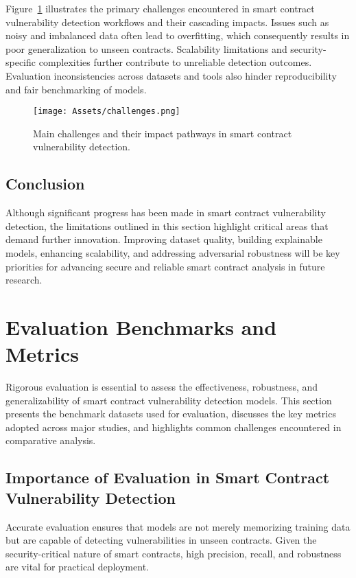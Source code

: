 Figure~\ref{fig:challenges_vulnerability_detection} illustrates the primary challenges encountered in smart contract vulnerability detection workflows and their cascading impacts. Issues such as noisy and imbalanced data often lead to overfitting, which consequently results in poor generalization to unseen contracts. Scalability limitations and security-specific complexities further contribute to unreliable detection outcomes. Evaluation inconsistencies across datasets and tools also hinder reproducibility and fair benchmarking of models.

\begin{figure}[H]
    \centering
    \texttt{[image: Assets/challenges.png]}
    \caption{Main challenges and their impact pathways in smart contract vulnerability detection.}
    \label{fig:challenges_vulnerability_detection}
\end{figure}
\subsection*{Conclusion}

Although significant progress has been made in smart contract vulnerability detection, the limitations outlined in this section highlight critical areas that demand further innovation. Improving dataset quality, building explainable models, enhancing scalability, and addressing adversarial robustness will be key priorities for advancing secure and reliable smart contract analysis in future research.

\section{Evaluation Benchmarks and Metrics}
Rigorous evaluation is essential to assess the effectiveness, robustness, and generalizability of smart contract vulnerability detection models. This section presents the benchmark datasets used for evaluation, discusses the key metrics adopted across major studies, and highlights common challenges encountered in comparative analysis.

\subsection*{Importance of Evaluation in Smart Contract Vulnerability Detection}

Accurate evaluation ensures that models are not merely memorizing training data but are capable of detecting vulnerabilities in unseen contracts. Given the security-critical nature of smart contracts, high precision, recall, and robustness are vital for practical deployment.

